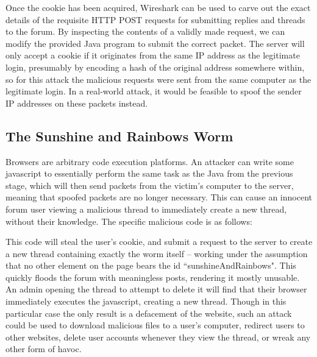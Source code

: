 Once the cookie has been acquired, Wireshark can be used to carve out the exact details of the requisite HTTP POST
requests for submitting replies and threads to the forum. By inspecting the contents of a validly made request, we can
modify the provided Java program to submit the correct packet. The server will only accept a cookie if it originates
from the same IP address as the legitimate login, presumably by encoding a hash of the original address somewhere
within, so for this attack the malicious requests were sent from the same computer as the legitimate login. In a
real-world attack, it would be feasible to spoof the sender IP addresses on these packets instead.


\subsection{The Sunshine and Rainbows Worm}

Browsers are arbitrary code execution platforms. An attacker can write some javascript to essentially perform the same
task as the Java from the previous stage, which will then send packets from the victim's computer to the server, meaning
that spoofed packets are no longer necessary. This can cause an innocent forum user viewing a malicious thread to
immediately create a new thread, without their knowledge. The specific malicious code is as follows:


This code will steal the user's cookie, and submit a request to the server to create a new thread containing exactly the
worm itself -- working under the assumption that no other element on the page bears the id ``sunshineAndRainbows". This
quickly floods the forum with meaningless posts, rendering it mostly unusable. An admin opening the thread to attempt to
delete it will find that their browser immediately executes the javascript, creating a new thread. Though in this
particular case the only result is a defacement of the website, such an attack could be used to download malicious files
to a user's computer, redirect users to other websites, delete user accounts whenever they view the thread, or wreak any
other form of havoc.

